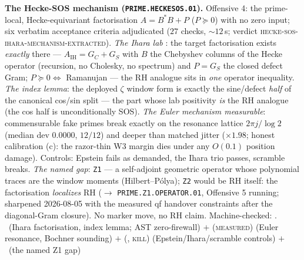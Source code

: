 \documentclass[11pt,a4paper]{article}
\theoremstyle{definition}
\begin{document}
\par\smallskip\noindent\textbf{The Hecke-SOS mechanism
(\texttt{PRIME.HECKESOS.01}).}
Offensive 4: the prime-local, Hecke-equivariant factorisation
$A=B^*B+P$ ($P\succeq0$) with no zero input; six verbatim acceptance
criteria adjudicated ($27$ checks, ${\sim}12$\,s; verdict
\textsc{hecke-sos-ihara-mechanism-extracted}).  \emph{The Ihara lab}
\mE: the target factorisation exists \emph{exactly} there ---
$A_{\mathrm{IH}}=G_C+G_S$ with $B$ the Chebyshev columns of the
Hecke operator (recursion, no Cholesky, no spectrum) and $P=G_S$ the
closed defect Gram; $P\succeq0\iff$ Ramanujan --- the RH analogue
sits in \emph{one} operator inequality.  \emph{The index lemma}: the
deployed $\zeta$ window form is exactly the sine/defect \emph{half}
of the canonical cos/sin split --- the part whose lab positivity
\emph{is} the RH analogue (the cos half is unconditionally SOS).
\emph{The Euler mechanism measurable}: commensurable fake primes
break exactly on the resonance lattice $2\pi j/\log2$ (median dev
$0.0000$, $12/12$) and deeper than matched jitter ($\times1.98$;
honest calibration (c): the razor-thin W3 margin dies under any
$O(0.1)$ position damage).  Controls: Epstein fails as demanded,
the Ihara trio passes, scramble breaks.  \emph{The named gap}:
\texttt{Z1} --- a self-adjoint geometric operator whose polynomial
traces are the window moments (Hilbert--P\'olya); \texttt{Z2} would
be RH itself: the factorisation \emph{localizes} RH
($\to$ \texttt{PRIME.Z1.OPERATOR.01}, Offensive 5 running;
sharpened 2026-08-05 with the measured qf handover constraints
after the diagonal-Gram closure).  No
marker move, no RH claim.
Machine-checked: .
\mE\ (Ihara factorisation, index lemma; AST zero-firewall) $+$
(\textsc{measured}) (Euler resonance, Bochner sounding) $+$ (\mE,
\textsc{kill}) (Epstein/Ihara/scramble controls) $+$ \mC\ (the named
Z1 gap)
\par\smallskip
\end{document}
